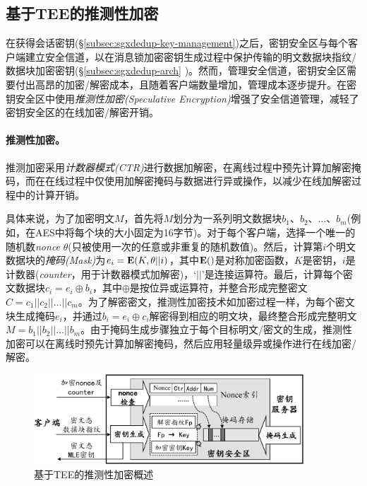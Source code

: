 \subsection{基于TEE的推测性加密}
\label{subsec:sgxdedup-encryption}

在获得会话密钥(\S\ref{subsec:sgxdedup-key-management})之后，密钥安全区与每个客户端建立安全信道，以在消息锁加密密钥生成过程中保护传输的明文数据块指纹/数据块加密密钥(\S\ref{subsec:sgxdedup-arch} )。然而，管理安全信道，密钥安全区需要付出高昂的加密/解密成本，且随着客户端数量增加，管理成本逐步提升。\sysnameS 在密钥安全区中使用\textit{推测性加密(Speculative Encryption)}\cite{eduardo2019Speculative}增强了安全信道管理，减轻了密钥安全区的在线加密/解密开销。

\paragraph*{推测性加密。}推测加密\cite{eduardo2019Speculative}采用\textit{计数器模式(CTR)}\cite{counter}进行数据加解密，在离线过程中预先计算加解密掩码，而在在线过程中仅使用加解密掩码与数据进行异或操作，以减少在线加解密过程中的计算开销。

具体来说，为了加密明文$M$，首先将$M$划分为一系列明文数据块$b_1、b_2、\ldots、b_m$(例如，在AES中将每个块的大小固定为16字节)。对于每个客户端，选择一个唯一的随机数\textit{nonce} $\theta$(只被使用一次的任意或非重复的随机数值)。然后，计算第$i$个明文数据块的\textit{掩码(Mask)}为$e_i = {\bf E}(K, \theta || i)$，其中${\bf E}()$是对称加密函数，$K$是密钥，$i$是计数器(\textit{counter}，用于计数器模式加解密)，‘$||$’是连接运算符。最后，计算每个密文数据块$c_i = e_i \oplus b_i $，其中$\oplus$是按位异或运算符，并整合形成完整密文$C = c_1 || c_2 || \ldots || c_m$。为了解密密文，推测性加密技术如加密过程一样，为每个密文块生成掩码$e_i$，并通过$b_i = e_i \oplus c_i $解密得到相应的明文块，最终整合形成完整明文$M = b_1 || b_2 || \ldots || b_m$。由于掩码生成步骤独立于每个目标明文/密文的生成，推测性加密可以在离线时预先计算加解密掩码，然后应用轻量级异或操作进行在线加密/解密。

\begin{figure}[!htb]
\centering
\includegraphics[width=0.9\textwidth]{pic/sgxdedup/key-enclave-arch.pdf}
\caption{基于TEE的推测性加密概述}
\label{fig:sgxdedup-SpecEnc}
\end{figure}

